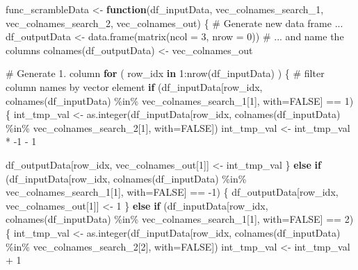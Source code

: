 \documentclass[
]{article}
\newenvironment{Shaded}{\begin{snugshade}}{\end{snugshade}}
\newcommand{\AttributeTok}[1]{\textcolor[rgb]{0.00,0.34,0.68}{#1}}
\newcommand{\CommentTok}[1]{\textcolor[rgb]{0.54,0.53,0.53}{#1}}
\newcommand{\ConstantTok}[1]{\textcolor[rgb]{0.67,0.33,0.00}{#1}}
\newcommand{\ControlFlowTok}[1]{\textcolor[rgb]{0.12,0.11,0.11}{\textbf{#1}}}
\newcommand{\DecValTok}[1]{\textcolor[rgb]{0.69,0.50,0.00}{#1}}
\newcommand{\FunctionTok}[1]{\textcolor[rgb]{0.39,0.29,0.61}{#1}}
\newcommand{\NormalTok}[1]{\textcolor[rgb]{0.12,0.11,0.11}{#1}}
\newcommand{\OtherTok}[1]{\textcolor[rgb]{0.00,0.43,0.16}{#1}}
\newcommand{\SpecialCharTok}[1]{\textcolor[rgb]{0.24,0.68,0.91}{#1}}
\begin{document}
\begin{Shaded}
\begin{Highlighting}[]
\NormalTok{func\_scrambleData }\OtherTok{\textless{}{-}} \ControlFlowTok{function}\NormalTok{(df\_inputData, vec\_colnames\_search\_1, vec\_colnames\_search\_2, vec\_colnames\_out) \{}
  \CommentTok{\# Generate new data frame ...}
\NormalTok{  df\_outputData }\OtherTok{\textless{}{-}} \FunctionTok{data.frame}\NormalTok{(}\FunctionTok{matrix}\NormalTok{(}\AttributeTok{ncol =} \DecValTok{3}\NormalTok{, }\AttributeTok{nrow =} \DecValTok{0}\NormalTok{))}
  \CommentTok{\# ... and name the columns}
  \FunctionTok{colnames}\NormalTok{(df\_outputData) }\OtherTok{\textless{}{-}}\NormalTok{ vec\_colnames\_out}
  
  \CommentTok{\# Generate 1. column}
  \ControlFlowTok{for}\NormalTok{ ( row\_idx }\ControlFlowTok{in} \DecValTok{1}\SpecialCharTok{:}\FunctionTok{nrow}\NormalTok{(df\_inputData) ) \{}
    \CommentTok{\# filter column names by vector element}
    \ControlFlowTok{if}\NormalTok{ (df\_inputData[row\_idx, }\FunctionTok{colnames}\NormalTok{(df\_inputData) }\SpecialCharTok{\%in\%}\NormalTok{ vec\_colnames\_search\_1[}\DecValTok{1}\NormalTok{], }\AttributeTok{with=}\ConstantTok{FALSE}\NormalTok{] }\SpecialCharTok{==} \DecValTok{1}\NormalTok{) \{}
\NormalTok{      int\_tmp\_val }\OtherTok{\textless{}{-}} \FunctionTok{as.integer}\NormalTok{(df\_inputData[row\_idx, }\FunctionTok{colnames}\NormalTok{(df\_inputData) }\SpecialCharTok{\%in\%}\NormalTok{ vec\_colnames\_search\_2[}\DecValTok{1}\NormalTok{], }\AttributeTok{with=}\ConstantTok{FALSE}\NormalTok{])}
\NormalTok{      int\_tmp\_val }\OtherTok{\textless{}{-}}\NormalTok{ int\_tmp\_val }\SpecialCharTok{*} \SpecialCharTok{{-}}\DecValTok{1} \SpecialCharTok{{-}} \DecValTok{1}

\NormalTok{      df\_outputData[row\_idx, vec\_colnames\_out[}\DecValTok{1}\NormalTok{]] }\OtherTok{\textless{}{-}}\NormalTok{ int\_tmp\_val}
\NormalTok{    \}}
    \ControlFlowTok{else} \ControlFlowTok{if}\NormalTok{ (df\_inputData[row\_idx, }\FunctionTok{colnames}\NormalTok{(df\_inputData) }\SpecialCharTok{\%in\%}\NormalTok{ vec\_colnames\_search\_1[}\DecValTok{1}\NormalTok{], }\AttributeTok{with=}\ConstantTok{FALSE}\NormalTok{] }\SpecialCharTok{==} \SpecialCharTok{{-}}\DecValTok{1}\NormalTok{) \{}
\NormalTok{      df\_outputData[row\_idx, vec\_colnames\_out[}\DecValTok{1}\NormalTok{]] }\OtherTok{\textless{}{-}} \DecValTok{1}
\NormalTok{    \}}
    \ControlFlowTok{else} \ControlFlowTok{if}\NormalTok{ (df\_inputData[row\_idx, }\FunctionTok{colnames}\NormalTok{(df\_inputData) }\SpecialCharTok{\%in\%}\NormalTok{ vec\_colnames\_search\_1[}\DecValTok{1}\NormalTok{], }\AttributeTok{with=}\ConstantTok{FALSE}\NormalTok{] }\SpecialCharTok{==} \DecValTok{2}\NormalTok{) \{}
\NormalTok{      int\_tmp\_val }\OtherTok{\textless{}{-}} \FunctionTok{as.integer}\NormalTok{(df\_inputData[row\_idx, }\FunctionTok{colnames}\NormalTok{(df\_inputData) }\SpecialCharTok{\%in\%}\NormalTok{ vec\_colnames\_search\_2[}\DecValTok{2}\NormalTok{], }\AttributeTok{with=}\ConstantTok{FALSE}\NormalTok{])}
\NormalTok{      int\_tmp\_val }\OtherTok{\textless{}{-}}\NormalTok{ int\_tmp\_val }\SpecialCharTok{+} \DecValTok{1}


\end{Highlighting}
\end{Shaded}
\end{document}
